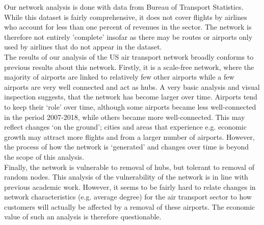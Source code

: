 \label{sec:results}
Our network analysis is done with data from Bureau of Transport Statistics. While this dataset is fairly comprehensive, it does not cover flights by airlines who account for less than one percent of revenues in the sector. The network is therefore not entirely 'complete' insofar as there may be routes or airports only used by airlines that do not appear in the dataset.\\
The results of our analysis of the US air transport network broadly conforms to previous results about this network. Firstly, it is a scale-free network, where the majority of airports are linked to relatively few other airports while a few airports are very well connected and act as hubs. A very basic analysis and visual inspection suggests, that the network has become larger over time. Airports tend to keep their `role' over time, although some airports became less well-connected in the period 2007-2018, while others became more well-connected. This may reflect changes `on the ground'; cities and areas that experience e.g. economic growth may attract more flights and from a larger number of airports. However, the process of how the network is `generated' and changes over time is beyond the scope of this analysis. \\ 
Finally, the network is vulnerable to removal of hubs, but tolerant to removal of random nodes. This analysis of the vulnerability of the network is in line with previous academic work. However, it seems to be fairly hard to relate changes in network characteristics (e.g. average degree) for the air transport sector to how customers will actually be affected by a removal of these airports. The economic value of such an analysis is therefore questionable. \\

